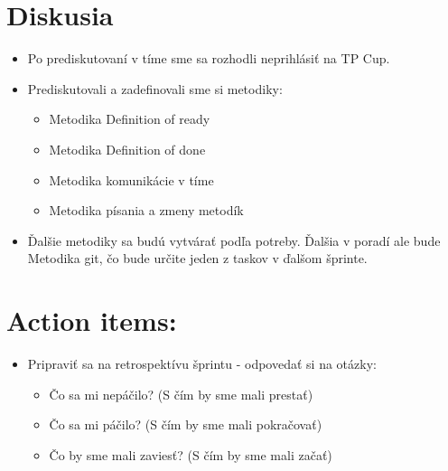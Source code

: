 \documentclass{article}
\begin{document}
    \section*{Diskusia}

    \begin{itemize}
        \item Po prediskutovaní v tíme sme sa rozhodli neprihlásiť na TP Cup.
        \item Prediskutovali a zadefinovali sme si metodiky:
        \begin{itemize}
            \item Metodika Definition of ready
            \item Metodika Definition of done
            \item Metodika komunikácie v tíme
            \item Metodika písania a zmeny metodík
        \end{itemize}
        \item Ďalšie metodiky sa budú vytvárať podľa potreby. Ďalšia v poradí ale bude Metodika git, čo bude určite jeden z taskov v ďalšom šprinte. 
    \end{itemize}


    \section*{Action items:}

    \begin{itemize}
    \item Pripraviť sa na retrospektívu šprintu - odpovedať si na otázky: 
        \begin{itemize}
            \item Čo sa mi nepáčilo? (S čím by sme mali prestať)
            \item Čo sa mi páčilo? (S čím by sme mali pokračovať)
            \item Čo by sme mali zaviesť? (S čím by sme mali začať)
        \end{itemize}      
    \end{itemize}
\end{document}
